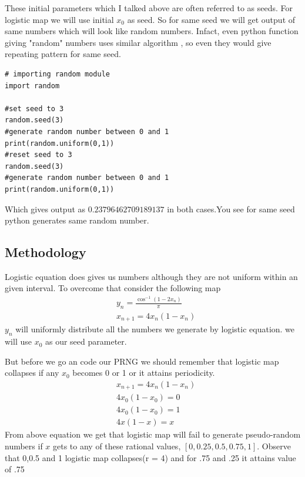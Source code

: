 \documentclass{report}
\begin{document}
These initial parameters which I talked above are often referred to as seeds. For logistic map we will use initial $x_0$ as seed. So for same seed we will get output of same  numbers which will look like random numbers. Infact, even python function giving "random" numbers uses similar algorithm , so even they would give repeating pattern for same seed.

\begin{lstlisting}
# importing random module
import random

#set seed to 3
random.seed(3)
#generate random number between 0 and 1
print(random.uniform(0,1))
#reset seed to 3
random.seed(3)
#generate random number between 0 and 1
print(random.uniform(0,1))
\end{lstlisting}

Which gives output as $0.23796462709189137$ in both cases.You see for same seed python generates same random number.
\newpage

\subsection{Methodology}
Logistic equation does gives us numbers although they are not uniform within an given interval. To overcome that consider the following map
\begin{align}
    &y_n = \frac{\cos^{-1}(1-2x_n)}{\pi}  \\
    &x_{n+1} = 4x_n(1-x_n) \nonumber
\end{align}
$y_n$ will uniformly distribute all the numbers we generate by logistic equation. we will use $x_0$ as our seed parameter.

But before we go an code our PRNG we should remember that logistic map collapses if any $x_0$ becomes 0 or 1 or it attains periodicity.
\begin{align}
    &x_{n+1} = 4x_n(1-x_n) \nonumber \\
    &4x_0(1-x_0) = 0 \nonumber \\
    &4x_0(1-x_0) = 1 \nonumber \\
    &4x(1-x) = x \nonumber
\end{align}
From above equation we get that logistic map will fail to generate pseudo-random numbers if $x$ gets to any of these rational values, $[0 , 0.25 , 0.5 , 0.75 , 1 ]$. Observe that 0,0.5 and 1 logistic map collapses(r = 4) and for .75 and .25 it attains value of .75
\end{document}

